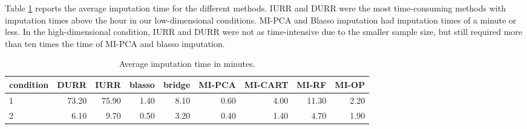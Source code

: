	Table \ref{tab:time} reports the average imputation time for the different methods.
	IURR and DURR were the most time-consuming methods with imputation times above the hour 
	in our low-dimensional conditions. 
	MI-PCA and Blasso imputation had imputation times of a minute or less.
	In the high-dimensional condition, IURR and DURR were not as time-intensive due to the smaller
	sample size, but still required more than ten times the time of MI-PCA and blasso imputation.

\begin{table}
	\centering
	\begin{tabular}{l | r | r | r | r | r | r | r | r }
		condition & DURR & IURR & blasso & bridge & MI-PCA & MI-CART & MI-RF & MI-OP \\
		\hline
		1 & 73.20 & 75.90 & 1.40 & 8.10 & 0.60 & 4.00 & 11.30 & 2.20 \\ 
		2 & 6.10 & 9.70 & 0.50 & 3.20 & 0.40 & 1.40 & 4.70 & 1.90 	
	\end{tabular}
	\caption{\label{tab:time}Average imputation time in minutes.}
\end{table}

\FloatBarrier


